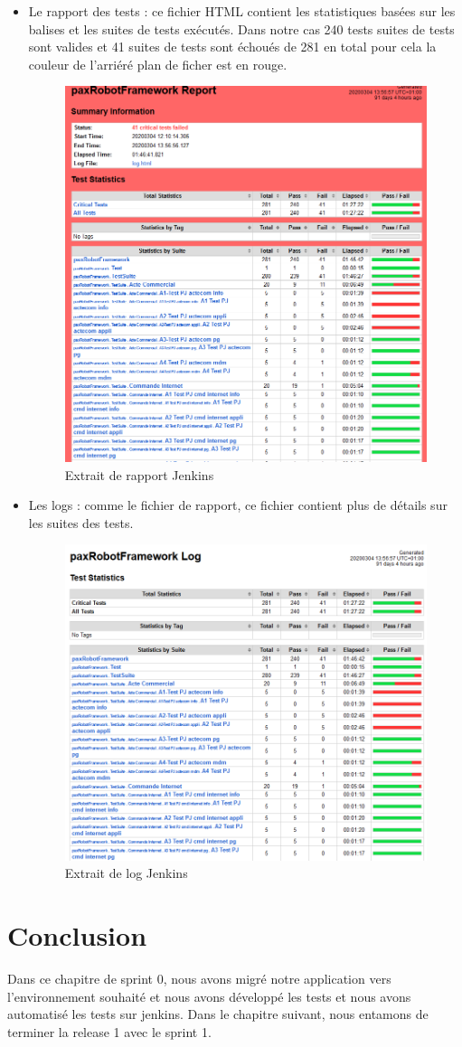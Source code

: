 \begin{itemize}
	\item Le rapport des tests : ce fichier HTML contient les statistiques basées sur les balises et les suites de tests exécutés. Dans notre cas 240 tests suites de tests sont valides  et 41 suites de tests sont échoués de 281 en total pour cela la couleur de l'arriéré plan de ficher est en rouge.
\begin{figure}[H]
		\centering
		\includegraphics[width=0.575\linewidth]{"img/jenkins/exemple report"}
		\caption[Extrait de rapport Jenkins]{Extrait de rapport Jenkins}
		\label{fig:exemple-report}
	\end{figure}
	\item Les logs : comme le fichier de rapport, ce fichier contient plus de détails sur les suites des tests.
	\begin{figure}[H]
		\centering
		\includegraphics[width=0.575\linewidth]{"img/jenkins/exemple log"}
		\caption[Extrait de log Jenkins]{Extrait de log Jenkins}
		\label{fig:exemple-log}
	\end{figure}
\end{itemize}

\section*{Conclusion}
Dans ce chapitre de sprint 0, nous avons migré notre application vers l’environnement souhaité et nous avons développé les tests et nous avons automatisé les tests sur jenkins. Dans le chapitre suivant, nous entamons de terminer la release 1 avec le sprint 1.



